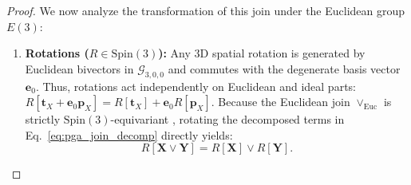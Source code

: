 \documentclass[10pt]{article}
\begin{document}
\begin{proof}
We now analyze the transformation of this join under the Euclidean group $E(3)$:
\begin{enumerate}
    \item \textbf{Rotations ($R \in \mathrm{Spin}(3)$):}
    Any 3D spatial rotation is generated by Euclidean bivectors in $\mathcal{G}_{3,0,0}$ and commutes with the degenerate basis vector $\mathbf{e}_0$. Thus, rotations act independently on Euclidean and ideal parts: $R[\mathbf{t}_X + \mathbf{e}_0 \mathbf{p}_X] = R[\mathbf{t}_X] + \mathbf{e}_0 R[\mathbf{p}_X]$. Because the Euclidean join $\vee_{\mathrm{Euc}}$ is strictly $\mathrm{Spin}(3)$-equivariant \citep[Lemma~5]{gatr}, rotating the decomposed terms in Eq.~\ref{eq:pga_join_decomp} directly yields:
    \begin{equation}
        R[\mathbf{X} \vee \mathbf{Y}] = R[\mathbf{X}] \vee R[\mathbf{Y}].
    \end{equation}


\end{enumerate}
\end{proof}
\end{document}
